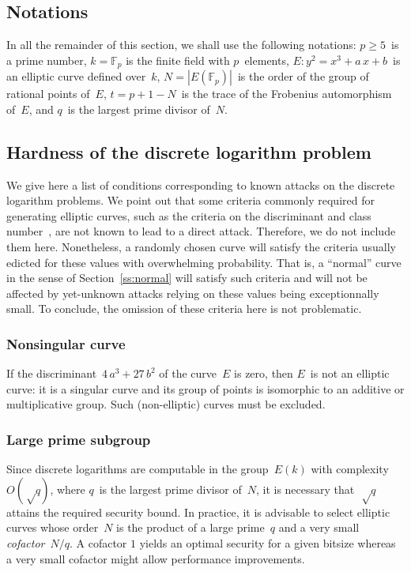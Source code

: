 \documentclass[twocolumn,letterpaper]{article}
\def\F{\mathbb{F}}
\def\abs#1{\left|#1\right|}
\begin{document}
\subsection*{Notations}
In all the remainder of this section,
we shall use the following notations:
$p ≥ 5$~is a prime number,
$k = \F_{p}$ is the finite field with $p$~elements,
$E: y^2 = x^3 + a\,x + b$~is an elliptic curve defined over~$k$,
$N = \abs{E(\F_p)}$~is the order of the group of rational points of~$E$,
$t = p + 1 - N$~is the trace of the Frobenius automorphism of~$E$,
and $q$~is the largest prime divisor of~$N$.

\subsection{Hardness of the discrete logarithm problem}
\label{ss:dlp}

We give here a list of conditions corresponding to
known attacks on the discrete logarithm problems.
We point out that some criteria commonly required
for generating elliptic curves,
such as the criteria on the discriminant and class number~\cite{rfc5639},
are not known to lead to a direct attack.
Therefore, we do not include them here.
Nonetheless, a randomly chosen curve will satisfy the
criteria usually edicted for these values with overwhelming probability.
That is, a “normal” curve in the sense of Section~\ref{ss:normal}
will satisfy such criteria and will not be affected by yet-unknown
attacks relying on these values being exceptionnally small.
To conclude, the omission of these criteria here is not problematic.

\subsubsection{Nonsingular curve}

If the discriminant~$4\, a^3 + 27\,b^2$
of the curve~$E$ is zero, then $E$~is not an elliptic curve:
it is a singular curve and its group of points is isomorphic to
an additive or multiplicative group.
Such (non-elliptic) curves must be excluded.

\subsubsection{Large prime subgroup}

Since discrete logarithms are computable in the group~$E(k)$
with complexity~$O(√q)$, where $q$~is the largest prime divisor of~$N$,
it is necessary that~$√q$ attains the required security bound.
In practice, it is advisable to select elliptic curves whose order~$N$
is the product of a large prime~$q$
and a very small \emph{cofactor}~$N/q$.
A cofactor $1$ yields an optimal security for a given bitsize
whereas a very small cofactor might allow performance improvements.
\end{document}
